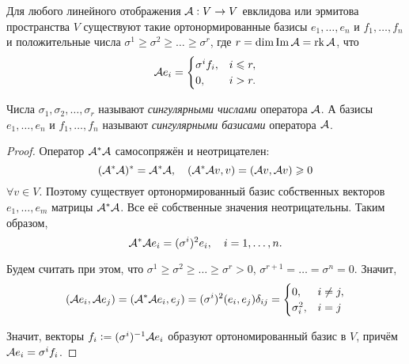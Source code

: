 \begin{theorem}
    Для любого линейного отображения $\mathcal{A}: V \to V$ евклидова или эрмитова пространства $V$ существуют такие ортонормированные базисы $e_1, \ldots, e_n$ и $f_1, \ldots, f_n$ и положительные числа $\sigma^1 \geqslant \sigma^2 \geqslant \ldots \geqslant \sigma^r$, где $r = \dim\operatorname{Im}\mathcal{A} = \operatorname{rk}\mathcal{A}$, что
    \[
        \mathcal{A} e_i =
        \begin{cases}
            \sigma^if_i,& i \leqslant r,\\
            0,& i > r.
        \end{cases}
    \]

    Числа $\sigma_1, \sigma_2, \ldots, \sigma_r$ называют \textit{сингулярными числами} оператора $\mathcal{A}$. А базисы $e_1, \ldots, e_n$ и $f_1, \ldots, f_n$ называют \textit{сингулярными базисами} оператора $\mathcal{A}$.
\end{theorem}

\begin{proof}
    Оператор $\mathcal{A}^\ast\mathcal{A}$ самосопряжён и неотрицателен:
    \[
        (\mathcal{A}^\ast\mathcal{A})^\ast = \mathcal{A}^\ast\mathcal{A},\quad(\mathcal{A}^\ast\mathcal{A} v, v) = (\mathcal{A} v, \mathcal{A} v) \geqslant 0
    \]
    $\forall v \in V$. Поэтому существует ортонормированный базис собственных векторов $e_1, \ldots, e_m$ матрицы $\mathcal{A}^\ast\mathcal{A}$. Все её собственные значения неотрицательны. Таким образом,
    \[
        \mathcal{A}^\ast\mathcal{A} e_i = (\sigma^i)^2e_i,\quad i = 1, \ldots, n.
    \]

    Будем считать при этом, что $\sigma^1 \geqslant \sigma^2 \geqslant \ldots \geqslant \sigma^r > 0$, $\sigma^{r + 1} = \ldots = \sigma^n = 0$. Значит,
    \[
        (\mathcal{A} e_i, \mathcal{A} e_j) = (\mathcal{A}^\ast\mathcal{A} e_i, e_j) = (\sigma^i)^2(e_i, e_j)\delta_{ij} =
        \begin{cases}
            0,& i \ne j,\\
            \sigma_i^2,& i = j
        \end{cases}
    \]

    Значит, векторы $f_i \vcentcolon = (\sigma^i)^{-1}\mathcal{A} e_i$ образуют ортономированный базис в $V$, причём $\mathcal{A} e_i = \sigma^if_i$.
\end{proof}

